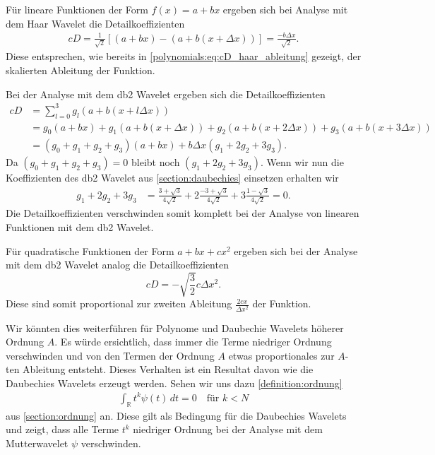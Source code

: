 \begin{refsection}
Für lineare Funktionen der Form $f(x) = a + b x$ ergeben sich bei Analyse mit
dem Haar Wavelet die Detailkoeffizienten
\begin{align*}
    cD = \frac{1}{\sqrt{2}} [ (a + b x) - (a + b (x + \Delta x)) ]
    = \frac{- b \Delta x}{\sqrt{2}}.
\end{align*}
Diese entsprechen, wie bereits in \cref{polynomials:eq:cD_haar_ableitung}
gezeigt, der skalierten Ableitung der Funktion.

Bei der Analyse mit dem db2 Wavelet ergeben sich die Detailkoeffizienten
\begin{align*}
    cD &= \sum_{l=0}^{3} g_l (a + b (x + l\Delta x)) \\
       &= g_0 (a + b x) + g_1 (a + b (x + \Delta x)) + g_2 (a + b (x + 2 \Delta x)) + g_3 (a + b (x + 3 \Delta x)) \\
       &= (g_0 + g_1 + g_2 + g_3) (a + bx) + b \Delta x (g_1 + 2 g_2 + 3 g_3).
\end{align*}
Da $(g_0 + g_1 + g_2 + g_3) = 0$ bleibt noch $(g_1 + 2 g_2 + 3 g_3)$. Wenn wir
nun die Koeffizienten des db2 Wavelet aus \cref{section:daubechies} einsetzen
erhalten wir
\begin{align*}
    g_1 + 2 g_2 + 3 g_3 &= \frac{3 + \sqrt{3}}{4\sqrt{2}} + 2 \frac{-3 + \sqrt{3}}{4\sqrt{2}} + 3 \frac{1 - \sqrt{3}}{4\sqrt{2}} = 0.
\end{align*}
Die Detailkoeffizienten verschwinden somit komplett bei der Analyse von
linearen Funktionen mit dem db2 Wavelet.

Für quadratische Funktionen der Form $a + bx + cx^2$ ergeben sich bei der
Analyse mit dem db2 Wavelet analog die Detailkoeffizienten \[cD =
-\sqrt{\frac{3}{2}} c \Delta x^2.\] Diese sind somit proportional zur zweiten
Ableitung $\frac{2c x}{\Delta x^2}$ der Funktion.

Wir könnten dies weiterführen für Polynome und Daubechie Wavelets höherer
Ordnung $A$. Es würde ersichtlich, dass immer die Terme niedriger Ordnung
verschwinden und von den Termen der Ordnung $A$ etwas proportionales zur
$A$-ten Ableitung entsteht. Dieses Verhalten ist ein Resultat davon wie die
Daubechies Wavelets erzeugt werden. Sehen wir uns dazu
\cref{definition:ordnung}
\begin{align*}
    \int_{\mathbb R} t^k\psi(t)\,dt=0\quad \text{für $k<N$}
\end{align*}
aus \cref{section:ordnung} an. Diese gilt als Bedingung für die Daubechies
Wavelets und zeigt, dass alle Terme $t^k$ niedriger Ordnung bei der Analyse mit
dem Mutterwavelet $\psi$ verschwinden.


\end{refsection}

